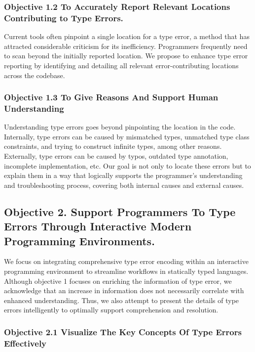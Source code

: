 \subsubsection*{Objective 1.2 To Accurately Report Relevant Locations Contributing to Type Errors.}
Current tools often pinpoint a single location for a type error, a method that has attracted considerable criticism for its inefficiency. Programmers frequently need to scan beyond the initially reported location. We propose to enhance type error reporting by identifying and detailing all relevant error-contributing locations across the codebase.

\subsubsection*{Objective 1.3 To Give Reasons And Support Human Understanding}
Understanding type errors goes beyond pinpointing the location in the code. Internally, type errors can be caused by mismatched types, unmatched type class constraints, and trying to construct infinite types, among other reasons. Externally, type errors can be caused by typos, outdated type annotation, incomplete implementation, etc. Our goal is not only to locate these errors but to explain them in a way that logically supports the programmer's understanding and troubleshooting process, covering both internal causes and external causes.



\subsection*{Objective 2. Support Programmers To Type Errors Through Interactive Modern Programming Environments.}

We focus on integrating comprehensive type error encoding within an interactive programming environment to streamline workflows in statically typed languages. Although objective 1 focuses on enriching the information of type error,  we acknowledge that an increase in information does not necessarily correlate with enhanced understanding. Thus, we also attempt to present the details of type errors intelligently to optimally support comprehension and resolution.

\subsubsection*{Objective 2.1 Visualize The Key Concepts Of Type Errors Effectively}

